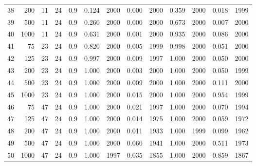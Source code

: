 \documentclass{article}
\begin{document}
\begin{table}[ht]
\begin{center}
\begin{tabular}{rrrrrrrrrrrrr}
  38 & 200 & 11 & 24 & 0.9 & 0.124 & 2000 & 0.000 & 2000 & 0.359 & 2000 & 0.018 & 1999 \\ 
  39 & 500 & 11 & 24 & 0.9 & 0.260 & 2000 & 0.000 & 2000 & 0.673 & 2000 & 0.007 & 2000 \\ 
  40 & 1000 & 11 & 24 & 0.9 & 0.631 & 2000 & 0.001 & 2000 & 0.935 & 2000 & 0.086 & 2000 \\ 
   \hline
41 & 75 & 23 & 24 & 0.9 & 0.820 & 2000 & 0.005 & 1999 & 0.998 & 2000 & 0.051 & 2000 \\ 
  42 & 125 & 23 & 24 & 0.9 & 0.997 & 2000 & 0.009 & 1997 & 1.000 & 2000 & 0.050 & 2000 \\ 
  43 & 200 & 23 & 24 & 0.9 & 1.000 & 2000 & 0.003 & 2000 & 1.000 & 2000 & 0.050 & 1999 \\ 
  44 & 500 & 23 & 24 & 0.9 & 1.000 & 2000 & 0.009 & 2000 & 1.000 & 2000 & 0.111 & 2000 \\ 
  45 & 1000 & 23 & 24 & 0.9 & 1.000 & 2000 & 0.015 & 2000 & 1.000 & 2000 & 0.954 & 1999 \\ 
   \hline
46 & 75 & 47 & 24 & 0.9 & 1.000 & 2000 & 0.021 & 1997 & 1.000 & 2000 & 0.070 & 1994 \\ 
  47 & 125 & 47 & 24 & 0.9 & 1.000 & 2000 & 0.014 & 1975 & 1.000 & 2000 & 0.059 & 1972 \\ 
  48 & 200 & 47 & 24 & 0.9 & 1.000 & 2000 & 0.011 & 1933 & 1.000 & 1999 & 0.099 & 1962 \\ 
  49 & 500 & 47 & 24 & 0.9 & 1.000 & 2000 & 0.060 & 1941 & 1.000 & 2000 & 0.511 & 1973 \\ 
  50 & 1000 & 47 & 24 & 0.9 & 1.000 & 1997 & 0.035 & 1855 & 1.000 & 2000 & 0.859 & 1867 \\ 
   \hline
\end{tabular}
\end{center}
\end{table}
\end{document}
